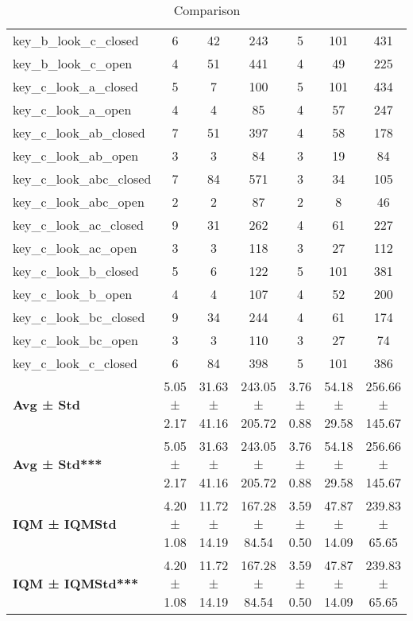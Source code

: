 \begin{table}[!ht]
\begin{tabular}{l|ccc|ccc}
key\_b\_look\_c\_closed & 6 & 42 & 243 & 5 & 101 & 431 \\
key\_b\_look\_c\_open & 4 & 51 & 441 & 4 & 49 & 225 \\
key\_c\_look\_a\_closed & 5 & 7 & 100 & 5 & 101 & 434 \\
key\_c\_look\_a\_open & 4 & 4 & 85 & 4 & 57 & 247 \\
key\_c\_look\_ab\_closed & 7 & 51 & 397 & 4 & 58 & 178 \\
key\_c\_look\_ab\_open & 3 & 3 & 84 & 3 & 19 & 84 \\
key\_c\_look\_abc\_closed & 7 & 84 & 571 & 3 & 34 & 105 \\
key\_c\_look\_abc\_open & 2 & 2 & 87 & 2 & 8 & 46 \\
key\_c\_look\_ac\_closed & 9 & 31 & 262 & 4 & 61 & 227 \\
key\_c\_look\_ac\_open & 3 & 3 & 118 & 3 & 27 & 112 \\
key\_c\_look\_b\_closed & 5 & 6 & 122 & 5 & 101 & 381 \\
key\_c\_look\_b\_open & 4 & 4 & 107 & 4 & 52 & 200 \\
key\_c\_look\_bc\_closed & 9 & 34 & 244 & 4 & 61 & 174 \\
key\_c\_look\_bc\_open & 3 & 3 & 110 & 3 & 27 & 74 \\
key\_c\_look\_c\_closed & 6 & 84 & 398 & 5 & 101 & 386 \\
\hline
\textbf{Avg ± Std} & 5.05 ± 2.17 & 31.63 ± 41.16 & 243.05 ± 205.72 & 3.76 ± 0.88 & 54.18 ± 29.58 & 256.66 ± 145.67 \\
\textbf{Avg ± Std***} & 5.05 ± 2.17 & 31.63 ± 41.16 & 243.05 ± 205.72 & 3.76 ± 0.88 & 54.18 ± 29.58 & 256.66 ± 145.67 \\
\textbf{IQM ± IQMStd} & 4.20 ± 1.08 & 11.72 ± 14.19 & 167.28 ± 84.54 & 3.59 ± 0.50 & 47.87 ± 14.09 & 239.83 ± 65.65 \\
\textbf{IQM ± IQMStd***} & 4.20 ± 1.08 & 11.72 ± 14.19 & 167.28 ± 84.54 & 3.59 ± 0.50 & 47.87 ± 14.09 & 239.83 ± 65.65 \\
\end{tabular}
\caption{Comparison}
\label{tab:batch3_CoinBox_pl__5_comparison_test}
\end{table}
